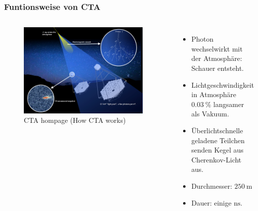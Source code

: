 \documentclass[aspectratio=1610, professionalfonts, 9pt]{beamer}
\begin{document}
  \begin{frame}
    \frametitle{Funtionsweise von CTA}
    \begin{columns}
        \begin{figure}
          \includegraphics[width=0.95\textwidth]{pictures/CTA.png}
          \caption{CTA hompage (How CTA works)}
          \label{abb:CTA}
        \end{figure}
        \begin{itemize}
          \item Photon wechselwirkt mit der Atmosphäre: Schauer entsteht.
          \item Lichtgeschwindigkeit in Atmosphäre $\SI{0.03}{\percent}$ langsamer als Vakuum.
          \item Überlichtschnelle geladene Teilchen senden Kegel aus Cherenkov-Licht aus.
          \item Durchmesser: $\SI{250}{\m}$
          \item Dauer: einige $\si{\nano\s}$.
        \end{itemize}
    \end{columns}
  \end{frame}
\end{document}
